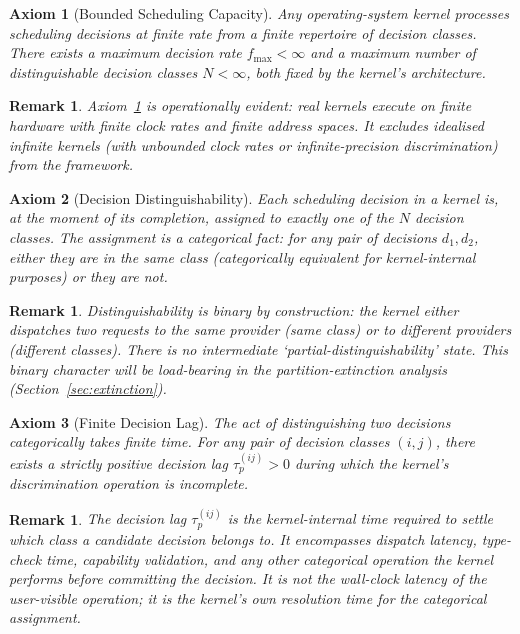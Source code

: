 \documentclass[twocolumn,11pt,a4paper]{article}
\newtheorem{remark}[theorem]{Remark}
\newtheorem{axiom}{Axiom}
\newcommand{\taup}{\tau_p}
\begin{document}
\begin{axiom}[Bounded Scheduling Capacity]
\label{ax:bounded}
Any operating-system kernel processes scheduling decisions at finite rate from a finite repertoire of decision classes. There exists a maximum decision rate $f_\mathrm{max} < \infty$ and a maximum number of distinguishable decision classes $N < \infty$, both fixed by the kernel's architecture.
\end{axiom}

\begin{remark}
Axiom~\ref{ax:bounded} is operationally evident: real kernels execute on finite hardware with finite clock rates and finite address spaces. It excludes idealised infinite kernels (with unbounded clock rates or infinite-precision discrimination) from the framework.
\end{remark}

\begin{axiom}[Decision Distinguishability]
\label{ax:distinguishable}
Each scheduling decision in a kernel is, at the moment of its completion, assigned to exactly one of the $N$ decision classes. The assignment is a categorical fact: for any pair of decisions $d_1, d_2$, either they are in the same class (categorically equivalent for kernel-internal purposes) or they are not.
\end{axiom}

\begin{remark}
Distinguishability is binary by construction: the kernel either dispatches two requests to the same provider (same class) or to different providers (different classes). There is no intermediate `partial-distinguishability' state. This binary character will be load-bearing in the partition-extinction analysis (Section~\ref{sec:extinction}).
\end{remark}

\begin{axiom}[Finite Decision Lag]
\label{ax:lag}
The act of distinguishing two decisions categorically takes finite time. For any pair of decision classes $(i, j)$, there exists a strictly positive \emph{decision lag} $\taup^{(ij)} > 0$ during which the kernel's discrimination operation is incomplete.
\end{axiom}

\begin{remark}
The decision lag $\taup^{(ij)}$ is the kernel-internal time required to settle which class a candidate decision belongs to. It encompasses dispatch latency, type-check time, capability validation, and any other categorical operation the kernel performs before committing the decision. It is not the wall-clock latency of the user-visible operation; it is the kernel's own resolution time for the categorical assignment.
\end{remark}
\end{document}
